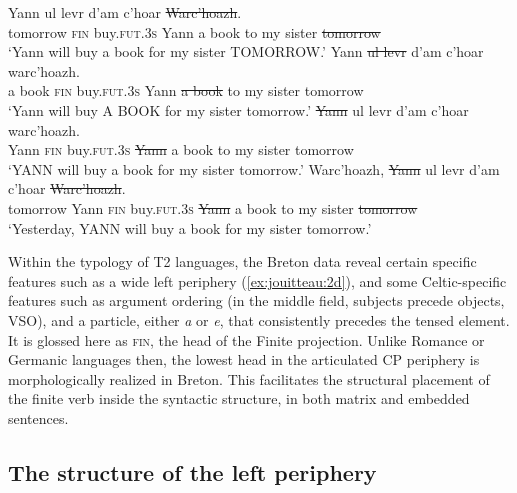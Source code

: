 \documentclass[output=paper,colorlinks,citecolor=brown]{langscibook}
\begin{document}
\ea \label{ex:jouitteau:2}
\ea \label{ex:jouitteau:2a}
\gll {} {} {} Yann ul levr d'am c’hoar \sout{Warc'hoazh}. \\  
 tomorrow \textsc{fin} buy.\textsc{fut}.\textsc{3s} Yann a book {to my} sister \sout{tomorrow} \\ 
\glt `Yann will buy a book for my sister TOMORROW.’ 
\ex \label{ex:jouitteau:2b}
\gll {} {} {} Yann \sout{ul levr} d'am c’hoar warc'hoazh. \\ 
{a book} \textsc{fin} buy.\textsc{fut}.\textsc{3s} Yann {\sout{a book}} {to my} sister tomorrow \\
\glt `Yann will buy A BOOK for my sister tomorrow.’ 
\ex \label{ex:jouitteau:2c}
\gll {} {} {} \sout{Yann} ul levr d'am c’hoar warc'hoazh.\\
Yann \textsc{fin} buy.\textsc{fut}.\textsc{3s} \sout{Yann} a book {to my} sister tomorrow\\
\glt `YANN will buy a book for my sister tomorrow.’
\ex \label{ex:jouitteau:2d}
\gll Warc’hoazh,  {} {} \sout{Yann} ul levr d'am c’hoar \sout{Warc’hoazh}.\\
tomorrow Yann \textsc{fin} buy.\textsc{\textsc{fut}}.\textsc{3s} \sout{Yann} a book {to my} sister \sout{tomorrow}\\
\glt ‘Yesterday, YANN will buy a book for my sister tomorrow.’
\z
\z

Within the typology of T2 languages, the Breton data reveal certain specific features such as a wide left periphery (\ref{ex:jouitteau:2d}), and some Celtic-specific features such as argument ordering (in the middle field, subjects precede objects, VSO), and a particle, either \textit{a} or \textit{e}, that consistently precedes the tensed element. It is glossed here as \textsc{fin}, the head of the Finite projection. Unlike Romance or Germanic languages then, the lowest head in the articulated CP periphery is morphologically realized in Breton. This facilitates the structural placement of the finite verb inside the syntactic structure, in both matrix and embedded sentences.

\subsection{The structure of the left periphery}
\end{document}
